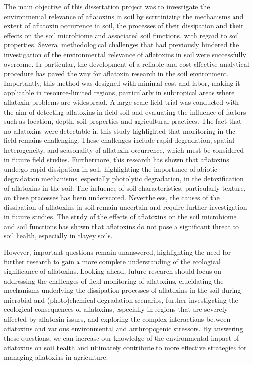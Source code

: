 The main objective of this dissertation project was to investigate the environmental relevance of aflatoxins in soil by scrutinizing the mechanisms and extent of aflatoxin occurrence in soil, the processes of their dissipation and their effects on the soil microbiome and associated soil functions, with regard to soil properties. Several methodological challenges that had previously hindered the investigation of the environmental relevance of aflatoxins in soil were successfully overcome. In particular, the development of a reliable and cost-effective analytical procedure has paved the way for aflatoxin research in the soil environment. Importantly, this method was designed with minimal cost and labor, making it applicable in resource-limited regions, particularly in subtropical areas where aflatoxin problems are widespread. A large-scale field trial was conducted with the aim of detecting aflatoxins in field soil and evaluating the influence of factors such as location, depth, soil properties and agricultural practices. The fact that no aflatoxins were detectable in this study highlighted that monitoring in the field remains challenging. These challenges include rapid degradation, spatial heterogeneity, and seasonality of aflatoxin occurrence, which must be considered in future field studies. Furthermore, this research has shown that aflatoxins undergo rapid dissipation in soil, highlighting the importance of abiotic degradation mechanisms, especially photolytic degradation, in the detoxification of aflatoxins in the soil. The influence of soil characteristics, particularly texture, on these processes has been underscored. Nevertheless, the causes of the dissipation of aflatoxins in soil remain uncertain and require further investigation in future studies. The study of the effects of aflatoxins on the soil microbiome and soil functions has shown that aflatoxins do not pose a significant threat to soil health, especially in clayey soils. 


However, important questions remain unanswered, highlighting the need for further research to gain a more complete understanding of the ecological significance of aflatoxins. Looking ahead, future research should focus on addressing the challenges of field monitoring of aflatoxins, elucidating the mechanisms underlying the dissipation processes of aflatoxins in the soil during microbial and (photo)chemical degradation scenarios, further investigating the ecological consequences of aflatoxins, especially in regions that are severely affected by aflatoxin issues, and exploring the complex interactions between aflatoxins and various environmental and anthropogenic stressors. By answering these questions, we can increase our knowledge of the environmental impact of aflatoxins on soil health and ultimately contribute to more effective strategies for managing aflatoxins in agriculture.
